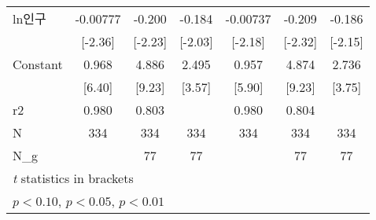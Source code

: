 \begin{tabular}{l*{6}{c}}
ln인구            &    -0.00777\sym{**} &      -0.200\sym{**} &      -0.184\sym{**} &    -0.00737\sym{**} &      -0.209\sym{**} &      -0.186\sym{**} \\
                    &     [-2.36]         &     [-2.23]         &     [-2.03]         &     [-2.18]         &     [-2.32]         &     [-2.15]         \\
\addlinespace
Constant            &       0.968\sym{***}&       4.886\sym{***}&       2.495\sym{***}&       0.957\sym{***}&       4.874\sym{***}&       2.736\sym{***}\\
                    &      [6.40]         &      [9.23]         &      [3.57]         &      [5.90]         &      [9.23]         &      [3.75]         \\
\midrule
r2                  &       0.980         &       0.803         &                     &       0.980         &       0.804         &                     \\
N                   &         334         &         334         &         334         &         334         &         334         &         334         \\
N\_g                 &                     &          77         &          77         &                     &          77         &          77         \\
\bottomrule
\multicolumn{7}{l}{\footnotesize \textit{t} statistics in brackets}\\
\multicolumn{7}{l}{\footnotesize \sym{*} \(p<0.10\), \sym{**} \(p<0.05\), \sym{***} \(p<0.01\)}\\
\end{tabular}